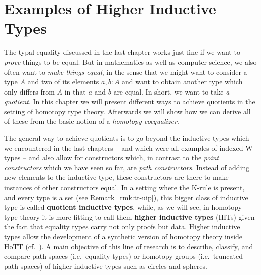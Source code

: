 \section{Examples of Higher Inductive Types}

The typal equality discussed in the last chapter works just fine if we want
to \emph{prove} things to be equal.
But in mathematics as well as computer science, we also often want to
\emph{make things equal}, in the sense that we might want to consider a type
$A$ and two of its elements $a, b : A$ and want to obtain
another type which only differs from $A$ in that $a$ and $b$ are equal.
In short, we want to take \emph{a quotient}.
In this chapter we will present different ways to achieve quotients in the setting
of homotopy type theory.
Afterwards we will show how we can derive all of these from the basic notion
of a \emph{homotopy coequalizer}.

The general way to achieve quotients is to go beyond the inductive types
which we encountered in the last chapters -- and which were all examples of
indexed W-types --
and also allow for constructors which,
in contrast to the \emph{point constructors} which we have seen so far,
are \emph{path constructors}.
Instead of adding new elements to the inductive type,
these constructors are there to make instances of other constructors equal.
In a setting where the K-rule is present, and every type is a set (see Remark~\ref{rmk:tt-uip}),
this bigger class of inductive type is called \textbf{quotient inductive types},
while, as we will see, in homotopy type theory it is more
fitting to call them \textbf{higher inductive types} (HITs) given the fact
that equality types carry not only proofs but data.
Higher inductive types
allow the development of a synthetic version of homotopy theory inside HoTT (cf.~\cite{Buchholtz2018,Buchholtz2018CellularCI,buchholtz2016cayley,BuchRijke_projectiveSpaces,favonia:SvK,licataFinster_Eilenberg,licataBrunerie_s1again,Brunerie2017,rijke:join}).
A main objective of this line of research is to describe, classify, and compare path spaces (i.e.\ equality types) or homotopy groups (i.e.\ truncated path spaces) of higher inductive types such as circles and spheres.

